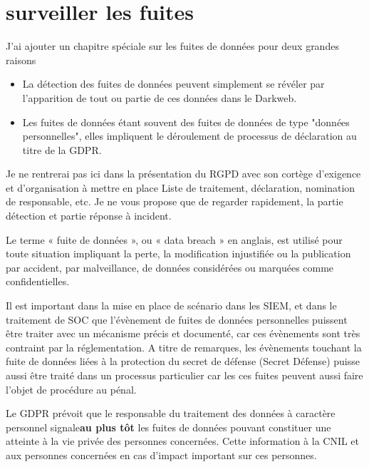 


\section{surveiller les fuites}

J'ai ajouter un chapitre spéciale sur les fuites de données pour deux grandes raisons

\begin{itemize}
  \item La détection des fuites de données peuvent simplement se révéler par l'apparition de tout ou partie de ces données dans le Darkweb. 
  \item Les fuites de données étant souvent des fuites de données de type "données personnelles", elles impliquent le déroulement de processus de déclaration au titre de la GDPR.
\end{itemize}


Je ne rentrerai pas ici dans la présentation du RGPD avec son cortège d'exigence et d'organisation à mettre en place
Liste de traitement, déclaration, nomination de responsable, etc.
Je ne vous propose que de regarder rapidement, la partie détection et partie réponse à incident.

Le terme « fuite de données », ou « data breach » en anglais, est utilisé pour toute situation impliquant la perte, la modification injustifiée ou la publication par accident, par malveillance, de données considérées ou marquées comme confidentielles. 

Il est important dans la mise en place de scénario dans les SIEM, et dans le traitement de SOC que l'évènement de fuites de données personnelles puissent être traiter avec un mécanisme précis et documenté, car ces évènements sont très contraint par la réglementation.
A titre de remarques, les évènements touchant la fuite de données liées à la protection du secret de défense (Secret Défense) puisse aussi être traité dans un processus particulier car les ces fuites peuvent aussi faire l'objet de procédure au pénal.


Le GDPR prévoit que le responsable du traitement des données à caractère personnel signale\textbf{au plus tôt} les fuites de données  pouvant constituer une atteinte à la vie privée des personnes concernées. Cette information à la CNIL et aux personnes concernées en cas d'impact important sur ces personnes.


